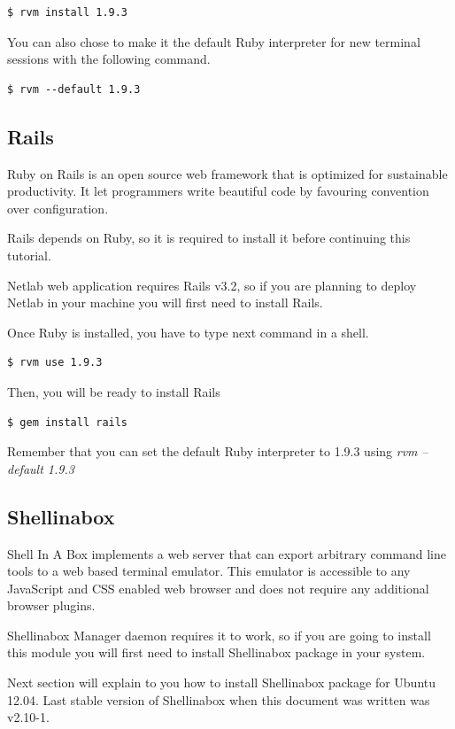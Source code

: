 \documentclass{article}
\begin{document}
\begin{verbatim}
$ rvm install 1.9.3
\end{verbatim}

You can also chose to make it the default Ruby interpreter for new terminal sessions with the following command.

\begin{verbatim}
$ rvm --default 1.9.3
\end{verbatim}

\subsection{Rails}
Ruby on Rails is an open source web framework that is optimized for sustainable productivity. It let programmers write beautiful code by favouring convention over configuration.

Rails depends on Ruby, so it is required to install it before continuing this tutorial.

Netlab web application requires Rails v3.2, so if you are planning to deploy Netlab in your machine you will first need to install Rails.

Once Ruby is installed, you have to type next command in a shell.
\begin{verbatim}
$ rvm use 1.9.3
\end{verbatim}

Then, you will be ready to install Rails

\begin{verbatim}
$ gem install rails
\end{verbatim}

Remember that you can set the default Ruby interpreter to 1.9.3 using \textit{rvm --default 1.9.3}

\subsection{Shellinabox}
Shell In A Box implements a web server that can export arbitrary command line tools to a web based terminal emulator. This emulator is accessible to any JavaScript and CSS enabled web browser and does not require any additional browser plugins.

Shellinabox Manager daemon requires it to work, so if you are going to install this module you will first need to install Shellinabox package in your system.

Next section will explain to you how to install Shellinabox package for Ubuntu 12.04. Last stable version of Shellinabox when this document was written was v2.10-1.
\end{document}
